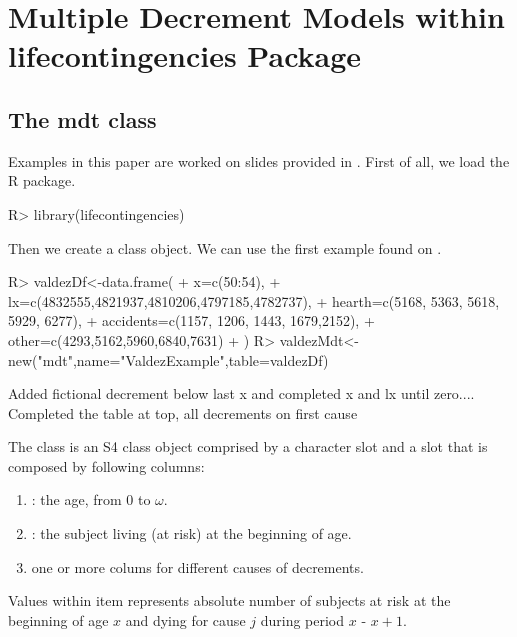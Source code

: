 \documentclass[nojss]{jss}
\begin{document}
\section{Multiple Decrement Models within lifecontingencies Package}
\subsection{The mdt class}

Examples in this paper are worked on slides provided in \cite{valdezSlides}.
First of all, we load the R package.

\begin{Schunk}
\begin{Sinput}
R> library(lifecontingencies)
\end{Sinput}
\end{Schunk}

Then  we create a  class object. We can use the first example found on
\cite[p. 4]{valdezSlide}.

\begin{Schunk}
\begin{Sinput}
R> valdezDf<-data.frame(
+ 		x=c(50:54),
+ 		lx=c(4832555,4821937,4810206,4797185,4782737),
+ 		hearth=c(5168, 5363, 5618, 5929, 6277),
+ 		accidents=c(1157, 1206, 1443, 1679,2152),
+ 		other=c(4293,5162,5960,6840,7631)
+ )
R> valdezMdt<-new("mdt",name="ValdezExample",table=valdezDf)
\end{Sinput}
\begin{Soutput}
Added fictional decrement below last x and completed x and lx until zero.... 
Completed the table at top, all decrements on first cause 
\end{Soutput}
\end{Schunk}

The  class is an S4 class object \citep{chambers2008software}
comprised by a character slot  and a  slot
 that is composed by following columns:
\begin{enumerate}
  \item {}: the age, from 0 to $\omega$.
  \item {}: the subject living (at risk) at the beginning of age.
  \item one or more colums for different causes of decrements.
 \end{enumerate}
 
 Values within  item represents absolute number of subjects at risk at the beginning of age $x$ and dying for cause $j$ during period $x$ - $x+1$.\\
\end{document}
